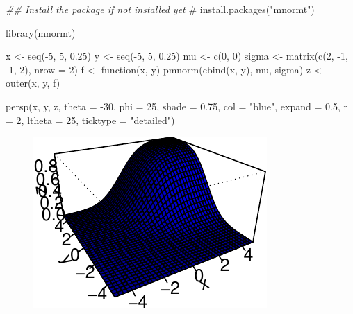 \documentclass[
  letterpaper,
  DIV=11,
  numbers=noendperiod]{scrreprt}
\newenvironment{Shaded}{\begin{snugshade}}{\end{snugshade}}
\newcommand{\AttributeTok}[1]{\textcolor[rgb]{0.40,0.45,0.13}{#1}}
\newcommand{\CommentTok}[1]{\textcolor[rgb]{0.37,0.37,0.37}{#1}}
\newcommand{\ControlFlowTok}[1]{\textcolor[rgb]{0.00,0.23,0.31}{#1}}
\newcommand{\DecValTok}[1]{\textcolor[rgb]{0.68,0.00,0.00}{#1}}
\newcommand{\DocumentationTok}[1]{\textcolor[rgb]{0.37,0.37,0.37}{\textit{#1}}}
\newcommand{\FloatTok}[1]{\textcolor[rgb]{0.68,0.00,0.00}{#1}}
\newcommand{\FunctionTok}[1]{\textcolor[rgb]{0.28,0.35,0.67}{#1}}
\newcommand{\NormalTok}[1]{\textcolor[rgb]{0.00,0.23,0.31}{#1}}
\newcommand{\OtherTok}[1]{\textcolor[rgb]{0.00,0.23,0.31}{#1}}
\newcommand{\SpecialCharTok}[1]{\textcolor[rgb]{0.37,0.37,0.37}{#1}}
\newcommand{\StringTok}[1]{\textcolor[rgb]{0.13,0.47,0.30}{#1}}
\theoremstyle{definition}
\theoremstyle{plain}
\theoremstyle{plain}
\theoremstyle{remark}
\begin{document}
\begin{Shaded}
\begin{Highlighting}[]
\DocumentationTok{\#\# Install the package if not installed yet}
\CommentTok{\# install.packages("mnormt")}

\FunctionTok{library}\NormalTok{(mnormt)}

\NormalTok{x     }\OtherTok{\textless{}{-}} \FunctionTok{seq}\NormalTok{(}\SpecialCharTok{{-}}\DecValTok{5}\NormalTok{, }\DecValTok{5}\NormalTok{, }\FloatTok{0.25}\NormalTok{) }
\NormalTok{y     }\OtherTok{\textless{}{-}} \FunctionTok{seq}\NormalTok{(}\SpecialCharTok{{-}}\DecValTok{5}\NormalTok{, }\DecValTok{5}\NormalTok{, }\FloatTok{0.25}\NormalTok{)}
\NormalTok{mu    }\OtherTok{\textless{}{-}} \FunctionTok{c}\NormalTok{(}\DecValTok{0}\NormalTok{, }\DecValTok{0}\NormalTok{)}
\NormalTok{sigma }\OtherTok{\textless{}{-}} \FunctionTok{matrix}\NormalTok{(}\FunctionTok{c}\NormalTok{(}\DecValTok{2}\NormalTok{, }\SpecialCharTok{{-}}\DecValTok{1}\NormalTok{, }\SpecialCharTok{{-}}\DecValTok{1}\NormalTok{, }\DecValTok{2}\NormalTok{), }\AttributeTok{nrow =} \DecValTok{2}\NormalTok{)}
\NormalTok{f     }\OtherTok{\textless{}{-}} \ControlFlowTok{function}\NormalTok{(x, y) }\FunctionTok{pmnorm}\NormalTok{(}\FunctionTok{cbind}\NormalTok{(x, y), mu, sigma)}
\NormalTok{z     }\OtherTok{\textless{}{-}} \FunctionTok{outer}\NormalTok{(x, y, f)}

\FunctionTok{persp}\NormalTok{(x, y, z, }\AttributeTok{theta =} \SpecialCharTok{{-}}\DecValTok{30}\NormalTok{, }\AttributeTok{phi =} \DecValTok{25}\NormalTok{, }
      \AttributeTok{shade =} \FloatTok{0.75}\NormalTok{, }\AttributeTok{col =} \StringTok{"blue"}\NormalTok{, }\AttributeTok{expand =} \FloatTok{0.5}\NormalTok{, }\AttributeTok{r =} \DecValTok{2}\NormalTok{, }
      \AttributeTok{ltheta =} \DecValTok{25}\NormalTok{, }\AttributeTok{ticktype =} \StringTok{"detailed"}\NormalTok{)}
\end{Highlighting}
\end{Shaded}

\begin{figure}[H]

{\centering \includegraphics{./02-Review-Prob_n_Stats_files/figure-pdf/unnamed-chunk-2-1.pdf}

}

\end{figure}
\end{document}
